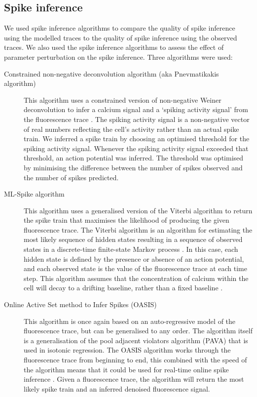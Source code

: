 \documentclass[a4paper,12pt]{article}
\theoremstyle{definition}
\begin{document}
\subsection{Spike inference}
We used spike inference algorithms to compare the quality of spike inference using the modelled traces to the quality of spike inference using the observed traces. We also used the spike inference algorithms to assess the effect of parameter perturbation on the spike inference. Three algorithms were used:
\begin{description}
    \item[Constrained non-negative deconvolution algorithm (aka Pnevmatikakis algorithm)] This algorithm uses a constrained version of non-negative Weiner deconvolution to infer a calcium signal and a `spiking activity signal' from the fluorescence trace \cite{vogelstein, pnevmatikakis}. The spiking activity signal is a non-negative vector of real numbers reflecting the cell's activity rather than an actual spike train. We inferred a spike train by choosing an optimised threshold for the spiking activity signal. Whenever the spiking activity signal exceeded that threshold, an action potential was inferred. The threshold was optimised by minimising the difference between the number of spikes observed and the number of spikes predicted.
    \item[ML-Spike algorithm] This algorithm uses a generalised version of the Viterbi algorithm to return the spike train that maximises the likelihood of producing the given fluorescence trace. The Viterbi algorithm is an algorithm for estimating the most likely sequence of hidden states resulting in a sequence of observed states in a discrete-time finite-state Markov process \cite{forney}. In this case, each hidden state is defined by the presence or absence of an action potential, and each observed state is the value of the fluorescence trace at each time step. This algorithm assumes that the concentration of calcium within the cell will decay to a drifting baseline, rather than a fixed baseline \cite{deneux}.
    \item[Online Active Set method to Infer Spikes (OASIS)] This algorithm is once again based on an auto-regressive model of the fluorescence trace, but can be generalised to any order. The algorithm itself is a generalisation of the pool adjacent violators algorithm (PAVA) that is used in isotonic regression. The OASIS algorithm works through the fluorescence trace from beginning to end, this combined with the speed of the algorithm means that it could be used for real-time online spike inference \cite{friedrich}. Given a fluorescence trace, the algorithm will return the most likely spike train and an inferred denoised fluorescence signal.
\end{description}
\end{document}
